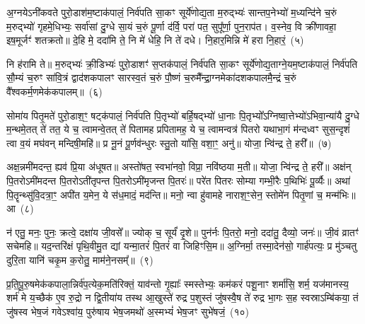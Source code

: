 {\anuvakamend[{व॒यं यद् विꣳ॑श॒तिश्च॑}]}%

अ॒ग्नये\-ऽनी॑कवते पुरो॒डाश॑\-म॒ष्टा\-क॑पालं॒ निर्व॑पति सा॒कꣳ सूर्ये॑णोद्य॒ता म॒रुद्भ्यः॑ सान्तप॒नेभ्यो॑ म॒ध्यन्दि॑ने च॒रुं म॒रुद्भ्यो॑ गृहमे॒धिभ्यः॒ सर्वा॑सां दु॒ग्धे सा॒यं च॒रुं पू॒र्णा द॑र्वि॒ परा॑ पत॒ सुपू᳚र्णा॒ पुन॒राप॑त। व॒स्नेव॒ वि क्री॑णावहा॒ इष॒मूर्जꣳ॑ शतक्रतो॥ दे॒हि मे॒ ददा॑मि ते॒ नि मे॑ धेहि॒ नि ते॑ दधे। नि॒हार॒मिन्नि मे॑ हरा नि॒हारं॒~(५)


नि ह॑रामि ते॥ म॒रुद्भ्यः॑ क्री॒डिभ्यः॑ पुरो॒डाशꣳ॑ स॒प्त\-क॑पालं॒ निर्व॑पति सा॒कꣳ सूर्ये॑णोद्य॒ताग्ने॒यम॒ष्टा\-क॑पालं॒ निर्व॑पति सौ॒म्यं च॒रुꣳ सा॑वि॒त्रं द्वाद॑श\-कपालꣳ सारस्व॒तं च॒रुं पौ॒ष्णं च॒रुमै᳚न्द्रा॒ग्नमेका॑\-दश\-कपालमै॒न्द्रं च॒रुं वै᳚श्वकर्म॒णमेक॑कपालम्॥~(६)

{\anuvakamend[{ह॒रा॒ नि॒हारं॑ त्रि॒ꣳ॒शच्च॑}]}%

सोमा॑य पितृ॒मते॑ पुरो॒डाश॒ꣳ॒ षट्\-क॑पालं॒ निर्व॑पति पि॒तृभ्यो॑ बर्\mbox{}हि॒षद्भ्यो॑ धा॒नाः पि॒तृभ्यो᳚\-ऽग्निष्वा॒त्तेभ्यो॑\-ऽभिवा॒न्या॑यै दु॒ग्धे म॒न्थमे॒तत् ते॑ तत॒ ये च॒ त्वामन्वे॒तत् ते॑ पितामह प्रपितामह॒ ये च॒ त्वामन्वत्र॑ पितरो यथाभा॒गं म॑न्दध्वꣳ सुस॒न्दृशं॑ त्वा व॒यं मघ॑वन् मन्दिषी॒महि॑॥ प्र नू॒नं पू॒र्णव॑न्धुरः स्तु॒तो या॑सि॒ वशा॒ꣳ॒ अनु॑॥ योजा॒ न्वि॑न्द्र ते॒ हरी᳚॥~(७)

अक्ष॒न्नमी॑मदन्त॒ ह्यव॑ प्रि॒या अ॑धूषत॥ अस्तो॑षत॒ स्वभा॑नवो॒ विप्रा॒ नवि॑ष्ठया म॒ती॥ योजा॒ न्वि॑न्द्र ते॒ हरी᳚॥ अक्ष॑न् पि॒तरो\-ऽमी॑मदन्त पि॒तरो\-ऽती॑तृपन्त पि॒तरो\-ऽमी॑मृजन्त पि॒तरः॑॥ परे॑त पितरः सोम्या गम्भी॒रैः प॒थिभिः॑ पू॒र्व्यैः॥ अथा॑ पि॒तॄन्थ्सु॑वि॒दत्रा॒ꣳ॒ अपी॑त य॒मेन॒ ये स॑ध॒मादं॒ मद॑न्ति॥ मनो॒ न्वा हु॑वामहे नाराश॒ꣳ॒सेन॒ स्तोमे॑न पितृ॒णां च॒ मन्म॑भिः॥ आ~(८)

न॑ एतु॒ मनः॒ पुनः॒ क्रत्वे॒ दक्षा॑य जी॒वसे᳚॥ ज्योक् च॒ सूर्यं॑ दृ॒शे॥ पुन॑र्नः पि॒तरो॒ मनो॒ ददा॑तु॒ दैव्यो॒ जनः॑॥ जी॒वं व्रातꣳ॑ सचेमहि॥ यद॒न्तरि॑क्षं पृथि॒वीमु॒त द्यां यन्मा॒तरं॑ पि॒तरं॑ वा जिहिꣳसि॒म॥ अ॒ग्निर्मा॒ तस्मा॒देन॑सो॒ गार्\mbox{}ह॑पत्यः॒ प्र मु॑ञ्चतु दुरि॒ता यानि॑ चकृ॒म क॒रोतु॒ माम॑ने॒नसम्᳚॥~(९)

{\anuvakamend[{हरी॒ मन्म॑भि॒रा चतु॑श्चत्वारिꣳशच्च}]}%

प्र॒ति॒पू॒रु॒षमेक॑कपाला॒न्निर्व॑प॒त्येक॒\-मति॑रिक्तं॒ याव॑न्तो गृ॒ह्याः᳚ स्मस्तेभ्यः॒ कम॑करं पशू॒नाꣳ शर्मा॑सि॒ शर्म॒ यज॑मानस्य॒ शर्म॑ मे य॒च्छैक॑ ए॒व रु॒द्रो न द्वि॒तीया॑य तस्थ आ॒खुस्ते॑ रुद्र प॒शुस्तं जु॑षस्वै॒ष ते॑ रुद्र भा॒गः स॒ह स्वस्रा\-ऽम्बि॑कया॒ तं जु॑षस्व भेष॒जं गवे\-ऽश्वा॑य॒ पुरु॑षाय भेष॒जमथो॑ अ॒स्मभ्यं॑ भेष॒जꣳ सुभे॑षजं॒~(१०)

